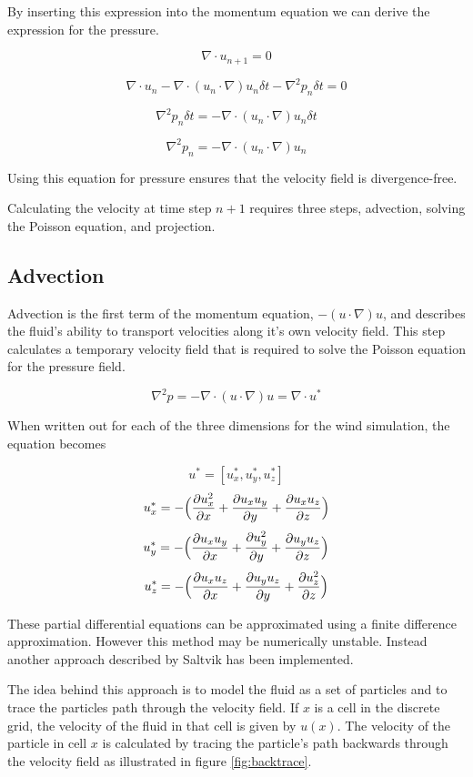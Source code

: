 By inserting this expression into the momentum equation we can derive the
expression for the pressure. 

$$ \nabla \cdot u_{n+1} = 0 $$

$$ \nabla \cdot u_n - \nabla \cdot (u_n \cdot \nabla)u_n \delta t - \nabla^2 p_n \delta t = 0 $$

$$ \nabla^2 p_n \delta t = - \nabla \cdot (u_n \cdot \nabla)u_n \delta t $$

$$ \nabla^2 p_n = - \nabla \cdot (u_n \cdot \nabla)u_n $$

Using this equation for pressure ensures that the velocity field is divergence-free.

Calculating the velocity at time step $n+1$ requires three steps, advection, 
solving the Poisson equation, and projection.

\subsection{Advection}

Advection is the first term of the momentum equation, $-(u \cdot \nabla)u$, and
describes the fluid's ability to transport velocities along it's own velocity 
field. This step calculates a temporary velocity field that is required to solve
the Poisson equation for the pressure field.

$$ \nabla^2 p = - \nabla \cdot (u \cdot \nabla)u = \nabla \cdot u^* $$

When written out for each of the three dimensions for the wind simulation, the
equation becomes

$$ u^* = [u^*_x, u^*_y, u^*_z] $$
$$ u^*_x = - \Big( \frac{\partial u_x^2}{\partial x} + \frac{\partial u_x u_y}{\partial y} + \frac{\partial u_x u_z}{\partial z}\Big) $$
$$ u^*_y = - \Big( \frac{\partial u_x u_y}{\partial x} + \frac{\partial u_y^2}{\partial y} + \frac{\partial u_y u_z}{\partial z}\Big) $$
$$ u^*_z = - \Big( \frac{\partial u_x u_z}{\partial x} + \frac{\partial u_y u_z}{\partial y} + \frac{\partial u_z^2}{\partial z}\Big) $$

These partial differential equations can be approximated using a finite difference
approximation. However this method may be numerically unstable. Instead another
approach described by Saltvik\cite{originalSnowThesis} has been implemented.

The idea behind this approach is to model the fluid as a set of particles and to
trace the particles path through the velocity field. If $x$ is a cell in the
discrete grid, the velocity of the fluid in that cell is given by $u(x)$. The
velocity of the particle in cell $x$ is calculated by tracing the particle's path
backwards through the velocity field as illustrated in figure \ref{fig:backtrace}.

